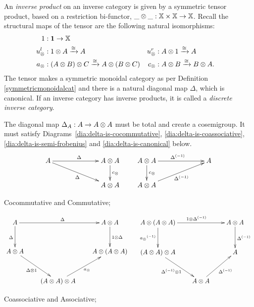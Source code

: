 \begin{definition}\label{def:inverse_product}
  An \emph{inverse product} on an inverse category \X is given by a symmetric tensor product, based
  on a restriction  bi-functor, $\_\otimes\_:\mathbb{X}\times\mathbb{X} \to \mathbb{X}$. Recall the structural maps of the tensor
  are the following  natural isomorphisms:
  \begin{align*}
    1 &: \boldsymbol{1}\to \mathbb{X} \\
    u_{\otimes}^l &: 1 \otimes A \xrightarrow{\cong} A
    &u_{\otimes}^r &: A \otimes 1 \xrightarrow{\cong} A\\
    a_{\otimes} &: (A \otimes B) \otimes C \xrightarrow{\cong} A \otimes (B \otimes C)
    &c_{\otimes} &: A \otimes B \xrightarrow{\cong} B \otimes A.
  \end{align*}
  The tensor makes \X a  symmetric  monoidal category as per Definition \ref{symmetricmonoidalcat}
  and there is a natural  diagonal map $\Delta$, which is canonical. If an inverse category has
  inverse products, it is called  a \emph{discrete inverse category}.

  The diagonal map $\Delta_A:A \to A\otimes A$ must be total and create a cosemigroup. It
  must satisfy Diagrams~\ref{dia:delta-is-cocommutative}, \ref{dia:delta-is-coassociative},
  \ref{dia:delta-is-semi-frobenius} and \ref{dia:delta-is-canonical} below.
  \begin{equation}
    \xymatrix @!0 @C=90pt @R=35pt{
      A \ar[dr]_{\Delta} \ar[r]^{\Delta} &
      A \* A \ar[d]^{c_{\*}}\\
      & A \* A
    }\qquad
    \xymatrix @!0 @C=90pt @R=35pt{
      A \* A \ar[d]^{c_{\*}} \ar[r]^{\inv{\Delta}}  & A\\
      A \* A  \ar[ur]_{\inv{\Delta}}
    }\label{dia:delta-is-cocommutative}
  \end{equation}
  \begin{center}Cocommutative and Commutative;\end{center}

  \begin{equation}
    \xymatrix @C=20pt @R=30pt{
      A \ar[rr]^{\Delta} \ar[d]_{\Delta} & &
      A \* A \ar[d]^{1\*\Delta}\\
      A\*A \ar[dr]_{\Delta \* 1}& &
      A \* ( A \* A) \\
      &   (A \* A) \* A \ar[ur]_{a_{\*}}
    }\ \quad
    \xymatrix @C=20pt @R=30pt{
      A\*(A\*A) \ar[rr]^{1\*\idelta} \ar[d]_{\inv{a_\*}} && A\*A \ar[d]^{\idelta}\\
      (A\*A)\*A \ar[dr]_{\idelta\*1}&&A\\
     & A\*A \ar[ur]_{\idelta}
    }\label{dia:delta-is-coassociative}
  \end{equation}
  \begin{center}Coassociative and Associative;\end{center}


\end{definition}
